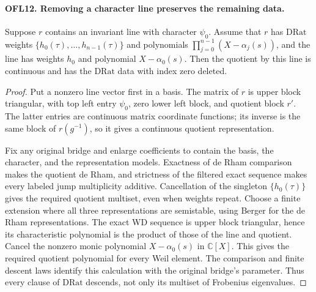 \paragraph{OFL12. Removing a character line preserves the remaining data.}
\label{claim:OFL12}
Suppose \(r\) contains an invariant line with character
\(\psi_0\).  Assume that \(r\) has \(\mathrm{DRat}\)
weights \(\{h_0(\tau),\ldots,h_{n-1}(\tau)\}\) and
polynomials \(\prod_{j=0}^{n-1}(X-\alpha_j(s))\), and the
line has weights \(h_0\) and polynomial \(X-\alpha_0(s)\).
Then the quotient by this line is continuous and has the
\(\mathrm{DRat}\) data with index zero deleted.
\begin{proof}
Put a nonzero line vector first in a basis.  The matrix of \(r\)
is upper block triangular, with top left entry \(\psi_0\),
zero lower left block, and quotient block \(r'\).
The latter entries are continuous matrix coordinate functions;
its inverse is the same block of \(r(g^{-1})\), so it gives
a continuous quotient representation.

Fix any original bridge and enlarge coefficients to contain the
basis, the character, and the representation models.  Exactness
of de Rham comparison makes the quotient de Rham, and strictness
of the filtered exact sequence makes every labeled jump
multiplicity additive.  Cancellation of the singleton
\(\{h_0(\tau)\}\) gives the required quotient multiset,
even when weights repeat.  Choose a finite extension where all
three representations are semistable, using Berger for the de
Rham representations.  The exact WD sequence is upper block
triangular, hence its characteristic polynomial is the product
of those of the line and quotient.  Cancel the nonzero monic
polynomial \(X-\alpha_0(s)\) in \(\mathbb C[X]\).
This gives the required quotient polynomial for every Weil
element.  The comparison and finite descent laws identify this
calculation with the original bridge's parameter.  Thus every
clause of \(\mathrm{DRat}\) descends, not only its multiset
of Frobenius eigenvalues.
\end{proof}

